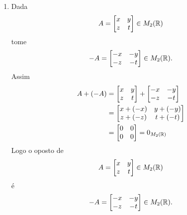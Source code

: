 \documentclass[12pt]{exam}
\begin{document}
\begin{enumerate}[label={\roman*})]
    \item Dada
    \[
        A = \begin{bmatrix}
        x & y\\
        z & t
    \end{bmatrix} \in M_2(\mathbb{R})
    \]
    tome
    \[
        -A = \begin{bmatrix}
        -x & -y\\
        -z & -t
    \end{bmatrix} \in M_2(\mathbb{R}).
    \]
    Assim
    \begin{align*}
      A + (-A) &= \begin{bmatrix}
        x & y\\
        z & t
    \end{bmatrix} + \begin{bmatrix}
        -x & -y\\
        -z & -t
    \end{bmatrix}\\ &= \begin{bmatrix}
        x + (-x) & y + (-y)\\
        z + (-z)& t + (-t)
    \end{bmatrix}\\ &= \begin{bmatrix}
        0 & 0\\
        0 & 0
    \end{bmatrix} = 0_{M_2(\mathbb{R})}
    \end{align*}
    Logo o oposto de
    \[
        A = \begin{bmatrix}
        x & y\\
        z & t
    \end{bmatrix} \in M_2(\mathbb{R})
    \] \'e
    \[
        -A = \begin{bmatrix}
        -x & -y\\
        -z & -t
    \end{bmatrix} \in M_2(\mathbb{R}).
    \]


\end{enumerate}
\end{document}
